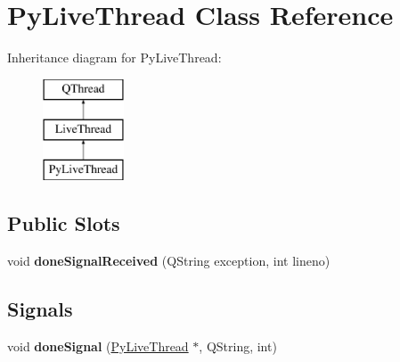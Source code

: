 \hypertarget{classPyLiveThread}{\section{Py\+Live\+Thread Class Reference}
\label{classPyLiveThread}
}
Inheritance diagram for Py\+Live\+Thread\+:\begin{figure}[H]
\begin{center}
\leavevmode
\includegraphics[height=3.000000cm]{classPyLiveThread}
\end{center}
\end{figure}
\subsection*{Public Slots}
\begin{DoxyCompactItemize}
\item 
\hypertarget{classPyLiveThread_a8f112d05d5eae7a756f3e60e4fe777b0}{void {\bfseries done\+Signal\+Received} (Q\+String exception, int lineno)}\label{classPyLiveThread_a8f112d05d5eae7a756f3e60e4fe777b0}

\end{DoxyCompactItemize}
\subsection*{Signals}
\begin{DoxyCompactItemize}
\item 
\hypertarget{classPyLiveThread_a2f8fffefb6729d062f6c03d716435c67}{void {\bfseries done\+Signal} (\hyperlink{classPyLiveThread}{Py\+Live\+Thread} $\ast$, Q\+String, int)}\label{classPyLiveThread_a2f8fffefb6729d062f6c03d716435c67}

\end{DoxyCompactItemize}
